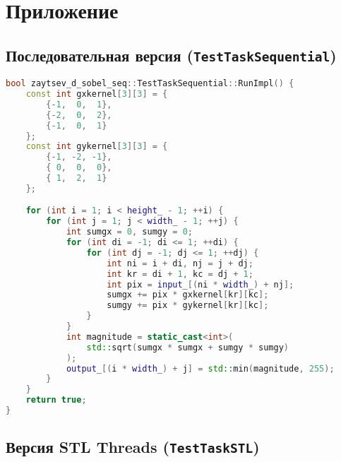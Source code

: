 \documentclass[12pt]{article}
\begin{document}
\newpage
\appendix
\section{Приложение}

\subsection{Последовательная версия (\texttt{TestTaskSequential})}

\begin{lstlisting}[language=C++, caption={Последовательная реализация оператора Собеля}]
bool zaytsev_d_sobel_seq::TestTaskSequential::RunImpl() {
    const int gxkernel[3][3] = {
        {-1,  0,  1},
        {-2,  0,  2},
        {-1,  0,  1}
    };
    const int gykernel[3][3] = {
        {-1, -2, -1},
        { 0,  0,  0},
        { 1,  2,  1}
    };

    for (int i = 1; i < height_ - 1; ++i) {
        for (int j = 1; j < width_ - 1; ++j) {
            int sumgx = 0, sumgy = 0;
            for (int di = -1; di <= 1; ++di) {
                for (int dj = -1; dj <= 1; ++dj) {
                    int ni = i + di, nj = j + dj;
                    int kr = di + 1, kc = dj + 1;
                    int pix = input_[(ni * width_) + nj];
                    sumgx += pix * gxkernel[kr][kc];
                    sumgy += pix * gykernel[kr][kc];
                }
            }
            int magnitude = static_cast<int>(
                std::sqrt(sumgx * sumgx + sumgy * sumgy)
            );
            output_[(i * width_) + j] = std::min(magnitude, 255);
        }
    }
    return true;
}
\end{lstlisting}

\subsection{Версия STL Threads (\texttt{TestTaskSTL})}
\end{document}
